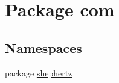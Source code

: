 \hypertarget{namespacecom}{\section{Package com}
\label{namespacecom}
}
\subsection*{Namespaces}
\begin{DoxyCompactItemize}
\item 
package \hyperlink{namespacecom_1_1shephertz}{shephertz}
\end{DoxyCompactItemize}
